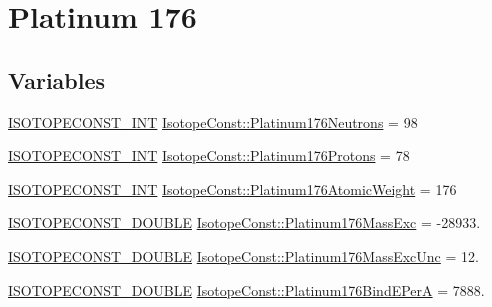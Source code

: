 \hypertarget{group___isotope_const-_platinum-_pt176}{}\section{Platinum 176}
\label{group___isotope_const-_platinum-_pt176}
\subsection*{Variables}
\begin{DoxyCompactItemize}
\item 
\mbox{\hyperlink{group___isotope_const-_macros_ga5f18360b3e99483a35c32d789e62621c}{I\+S\+O\+T\+O\+P\+E\+C\+O\+N\+S\+T\+\_\+\+I\+NT}} \mbox{\hyperlink{group___isotope_const-_platinum-_pt176_ga928d443d3201396a97efe0538f1b6e8a}{Isotope\+Const\+::\+Platinum176\+Neutrons}} = 98
\item 
\mbox{\hyperlink{group___isotope_const-_macros_ga5f18360b3e99483a35c32d789e62621c}{I\+S\+O\+T\+O\+P\+E\+C\+O\+N\+S\+T\+\_\+\+I\+NT}} \mbox{\hyperlink{group___isotope_const-_platinum-_pt176_ga351ca7fcda72a9a006001bd9fc82daba}{Isotope\+Const\+::\+Platinum176\+Protons}} = 78
\item 
\mbox{\hyperlink{group___isotope_const-_macros_ga5f18360b3e99483a35c32d789e62621c}{I\+S\+O\+T\+O\+P\+E\+C\+O\+N\+S\+T\+\_\+\+I\+NT}} \mbox{\hyperlink{group___isotope_const-_platinum-_pt176_ga10bebb6bd896c57779b9db1a9121b775}{Isotope\+Const\+::\+Platinum176\+Atomic\+Weight}} = 176
\item 
\mbox{\hyperlink{group___isotope_const-_macros_ga8f45a7272ce02c0b4c65c44636ed719a}{I\+S\+O\+T\+O\+P\+E\+C\+O\+N\+S\+T\+\_\+\+D\+O\+U\+B\+LE}} \mbox{\hyperlink{group___isotope_const-_platinum-_pt176_gacd309cf77645488fc8ac207a32c02445}{Isotope\+Const\+::\+Platinum176\+Mass\+Exc}} = -\/28933.
\item 
\mbox{\hyperlink{group___isotope_const-_macros_ga8f45a7272ce02c0b4c65c44636ed719a}{I\+S\+O\+T\+O\+P\+E\+C\+O\+N\+S\+T\+\_\+\+D\+O\+U\+B\+LE}} \mbox{\hyperlink{group___isotope_const-_platinum-_pt176_ga7433f3e1b12aa1ae1a17b277effdbcfc}{Isotope\+Const\+::\+Platinum176\+Mass\+Exc\+Unc}} = 12.
\item 
\mbox{\hyperlink{group___isotope_const-_macros_ga8f45a7272ce02c0b4c65c44636ed719a}{I\+S\+O\+T\+O\+P\+E\+C\+O\+N\+S\+T\+\_\+\+D\+O\+U\+B\+LE}} \mbox{\hyperlink{group___isotope_const-_platinum-_pt176_gabb5fd4dcf9d5b2aef7e028c3fc4a761e}{Isotope\+Const\+::\+Platinum176\+Bind\+E\+PerA}} = 7888.
\item 

\end{DoxyCompactItemize}
